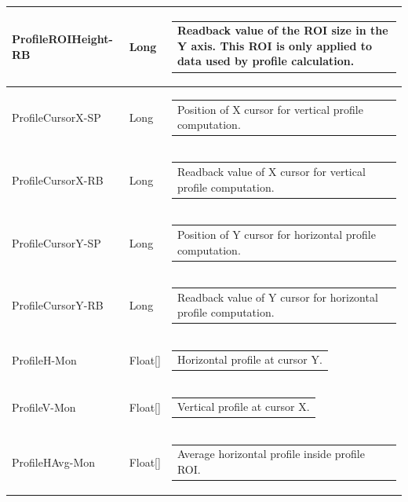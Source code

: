 \documentclass[openany]{article}
\begin{document}
\begin{longtable}{| m{3.0cm} m{4.5cm}  m{7.0cm} |}
        ProfileROIHeight-RB & Long & \begin{tabular}{@{}m{6cm}@{}}
                Readback value of the ROI size in the Y axis. This ROI is only applied to data used by profile calculation.
            \end{tabular} \hypertarget{pv:profile-cursor-x}{}\\ \hline
        ProfileCursorX-SP & Long & \begin{tabular}{@{}m{6cm}@{}}
                Position of X cursor for vertical profile computation.
            \end{tabular} \\ \hline
        ProfileCursorX-RB & Long & \begin{tabular}{@{}m{6cm}@{}}
                Readback value of X cursor for vertical profile computation.
            \end{tabular} \hypertarget{pv:profile-cursor-y}{}\\ \hline
        ProfileCursorY-SP & Long & \begin{tabular}{@{}m{6cm}@{}}
                Position of Y cursor for horizontal profile computation.
            \end{tabular} \\ \hline
        ProfileCursorY-RB & Long & \begin{tabular}{@{}m{6cm}@{}}
                Readback value of Y cursor for horizontal profile computation.
            \end{tabular} \hypertarget{pv:profile-h}{}\\ \hline
        ProfileH-Mon & Float[] & \begin{tabular}{@{}m{6cm}@{}}
                Horizontal profile at cursor Y.
            \end{tabular} \hypertarget{pv:profile-v}{}\\ \hline
        ProfileV-Mon & Float[] & \begin{tabular}{@{}m{6cm}@{}}
                Vertical profile at cursor X.
            \end{tabular} \hypertarget{pv:profile-h-avg}{}\\ \hline
        ProfileHAvg-Mon & Float[] & \begin{tabular}{@{}m{6cm}@{}}
                Average horizontal profile inside profile ROI.
            \end{tabular} \hypertarget{pv:profile-v-avg}{}\\ \hline

\end{longtable}
\end{document}
